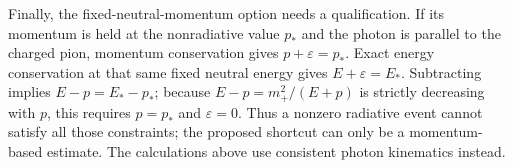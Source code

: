 Finally, the fixed-neutral-momentum option needs a qualification.
If its momentum is held at the nonradiative value $p_*$ and the
photon is parallel to the charged pion, momentum conservation gives
$p+\varepsilon=p_*$.  Exact energy conservation at that same fixed
neutral energy gives $E+\varepsilon=E_*$.  Subtracting implies
$E-p=E_*-p_*$; because $E-p=m_+^2/(E+p)$ is strictly decreasing
with $p$, this requires $p=p_*$ and $\varepsilon=0$.
Thus a nonzero radiative event cannot satisfy all those constraints;
the proposed shortcut can only be a momentum-based estimate.  The
calculations above use consistent photon kinematics instead.



